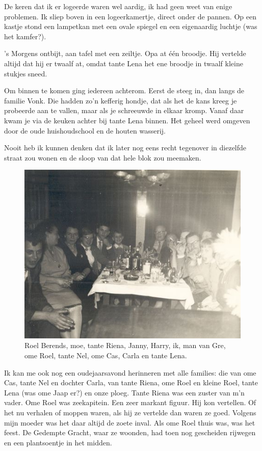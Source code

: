 \documentclass[12pt,twoside, openright]{memoir}
\begin{document}
De keren dat ik er logeerde waren wel aardig, ik had geen weet van enige problemen. Ik sliep boven in een logeerkamertje, direct onder de pannen. Op een kastje stond een lampetkan met een ovale spiegel en een eigenaardig luchtje (was het kamfer?). 

’s Morgens ontbijt, aan tafel met een zeiltje. Opa at één broodje. Hij vertelde altijd dat hij er twaalf at, omdat tante Lena het ene broodje in twaalf kleine stukjes sneed. 

Om binnen te komen ging iedereen achterom. Eerst de steeg in, dan langs de familie Vonk. Die hadden zo’n kefferig hondje, dat als het de kans kreeg je probeerde aan te vallen, maar als je schreeuwde in elkaar kromp. Vanaf daar kwam je via de keuken achter bij tante Lena binnen. Het geheel werd omgeven door de oude huishoudschool en de houten wasserij.  

Nooit heb ik kunnen denken dat ik later nog eens recht tegenover in diezelfde straat zou wonen en de sloop van dat hele blok zou meemaken.

\begin{figure}[h]
\includegraphics[width=\textwidth]{img/ch1-afb03}
\caption{Roel Berends, moe, tante Riena, Janny, Harry, ik, man van Gre, ome Roel, tante Nel, ome Cas, Carla en tante Lena.}
\end{figure}

Ik kan me ook nog een oudejaarsavond herinneren met alle families: die van ome Cas, tante Nel en dochter Carla, van tante Riena, ome Roel en kleine Roel, tante Lena (was ome Jaap er?) en onze ploeg. Tante Riena was een zuster van m’n vader. Ome Roel was zeekapitein. Een zeer markant figuur. Hij kon vertellen. Of het nu verhalen of moppen waren, als hij ze vertelde dan waren ze goed. Volgens mijn moeder was het daar altijd de zoete inval. Als ome Roel thuis was, was het feest. De Gedempte Gracht, waar ze woonden, had toen nog gescheiden rijwegen en een plantsoentje in het midden. 
\end{document}
